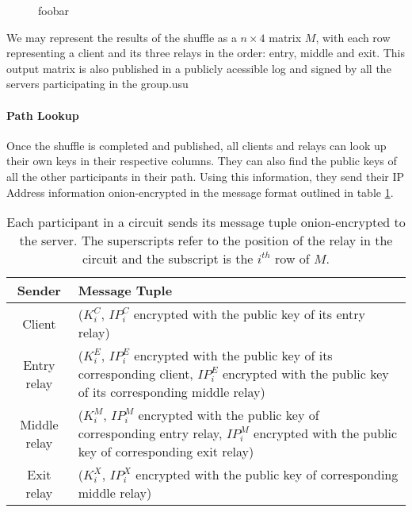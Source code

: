 \begin{figure}[htb]
\centering
\hspace{\fill}%
\hspace{\fill}%
\hspace*{\fill}%
\caption[bla]{foobar}
\end{figure}

We may represent the results of the shuffle as a $n \times 4$ matrix $M$, with
each row representing a client and its three relays in the order: entry, middle
and exit. This output matrix is also published in a publicly acessible log and
signed by all the servers participating in the group.usu

\paragraph{Path Lookup}
Once the shuffle is completed and published, all clients and relays can look up
their own keys in their respective columns. They can also find the public keys 
of all the other participants in their path. Using this information, they send 
their IP Address information onion-encrypted in the message format outlined in
table \ref{table:message_format}.

\begin{table}
  \begin{tabular}{ c || p{9cm} }
  \hline
  Sender & Message Tuple \\ \hline
  Client & ($K_{i}^{C}$, {$IP_{i}^{C}$ encrypted with the public key of its 
  entry relay}) \\ \hline
  Entry relay & ($K_{i}^{E}$, {$IP_{i}^{E}$ encrypted with the public key of 
  its corresponding client}, {$IP_{i}^{E}$ encrypted with the public key of 
  its corresponding middle relay}) \\ \hline
  Middle relay & ($K_{i}^{M}$, {$IP_{i}^{M}$ encrypted with the public key of 
  corresponding entry relay}, {$IP_{i}^{M}$ encrypted with the public key of 
  corresponding exit relay}) \\ \hline
  Exit relay & ($K_{i}^{X}$, {$IP_{i}^{X}$ encrypted with the public key of 
  corresponding middle relay}) \\ \hline
  \end{tabular}
  \caption{Each participant in a circuit sends its message 
  tuple onion-encrypted to the server. The superscripts refer to the position 
  of the relay in the circuit and the subscript is the $i^{th}$ row of $M$.}
  \label{table:message_format}
\end{table}

